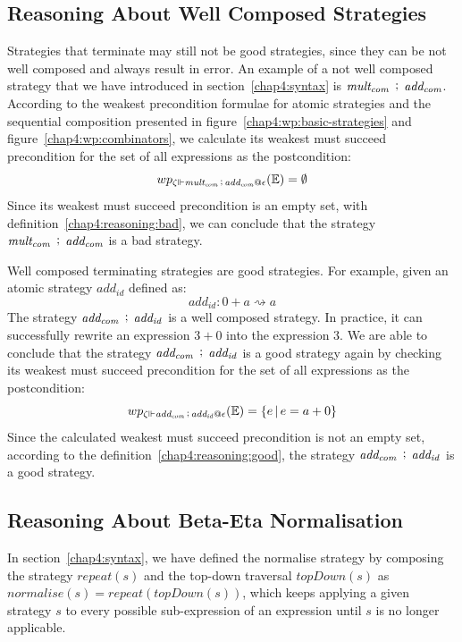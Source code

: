 \subsection{Reasoning About Well Composed Strategies}
\label{chap4:reasoning:well-composed}
Strategies that terminate may still not be good strategies, since they can be not well composed and always result in error. An example of a not well composed strategy that we have introduced in section~\ref{chap4:syntax} is $\mathit{mult_{com}} \, \mathrel{\mathop;} \, \mathit{add_{com}}$. According to the weakest precondition formulae for atomic strategies and the sequential composition presented in figure~\ref{chap4:wp:basic-strategies} and figure~\ref{chap4:wp:combinators}, we calculate its weakest must succeed precondition for the set of all expressions as the postcondition:
\[ wp_{\zeta \Vdash \mathit{mult_{com}} \, \mathrel{\mathop;} \, \mathit{add_{com}} @ \epsilon} (\mathbb{E}) = \emptyset\]
Since its weakest must succeed precondition is an empty set, with definition~\ref{chap4:reasoning:bad}, we can conclude that the strategy $\mathit{mult_{com}} \, \mathrel{\mathop;} \, \mathit{add_{com}}$ is a bad strategy.

Well composed terminating strategies are good strategies. For example, given an atomic strategy $\mathit{add_{id}}$ defined as:
\[\mathit{add_{id}} : 0 + a \rightsquigarrow a\]
The strategy $\mathit{add_{com}} \, \mathrel{\mathop;} \, \mathit{add_{id}}$ is a well composed strategy. In practice, it can successfully rewrite an expression $3 + 0$ into the expression $3$.
%
We are able to conclude that the strategy $\mathit{add_{com}} \, \mathrel{\mathop;} \, \mathit{add_{id}}$ is a good strategy again by checking its weakest must succeed precondition for the set of all expressions as the postcondition:
\[wp_{\zeta \Vdash \mathit{add_{com}} \, \mathrel{\mathop;} \, \mathit{add_{id}} @\epsilon} (\mathbb{E}) =\{ e \,|\, e = a + 0\}\]
Since the calculated weakest must succeed precondition is not an empty set, according to the definition~\ref{chap4:reasoning:good}, the strategy $\mathit{add_{com}} \, \mathrel{\mathop;} \, \mathit{add_{id}}$ is a good strategy.

\subsection{Reasoning About Beta-Eta Normalisation}
\label{chap4:reasoning:beta-eta}
In section~\ref{chap4:syntax}, we have defined the normalise strategy by composing the strategy $\mathit{repeat}(s)$ and the top-down traversal $\mathit{topDown}(s)$ as
$\mathit{normalise} (s) = \mathit{repeat}(\mathit{topDown} (s))$, which keeps applying a given strategy $s$ to every possible sub-expression of an expression until $s$ is no longer applicable.


